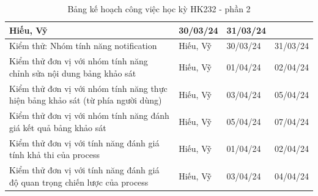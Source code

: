 \begin{table}[H]
{\begin{tabular}{|p{11cm}|p{1.75cm}|p{1.5cm}|p{1.5cm}|}
        { Hiếu, Vỹ} &
        { 30/03/24} &
        { 31/03/24} \\ \hline
        { Kiểm thử: Nhóm tính năng notification} &
        { Hiếu, Vỹ} &
        { 30/03/24} &
        { 31/03/24} \\ \hline
        { Kiểm thử đơn vị với nhóm tính năng chỉnh sửa nội dung bảng khảo sát} &
        { Hiếu, Vỹ} &
        { 01/04/24} &
        { 02/04/24} \\ \hline
        { Kiểm thử đơn vị với nhóm tính năng thực hiện bảng khảo sát (từ phía người dùng)} &
        { Hiếu, Vỹ} &
        { 03/04/24} &
        { 05/04/24} \\ \hline
        { Kiểm thử đơn vị với nhóm tính năng đánh giá kết quả bảng khảo sát} &
        { Hiếu, Vỹ} &
        { 05/04/24} &
        { 07/04/24} \\ \hline
        { Kiểm thử đơn vị với tính năng đánh giá tính khả thi của process} &
        { Hiếu, Vỹ} &
        { 01/04/24} &
        { 02/04/24} \\ \hline
        { Kiểm thử đơn vị với tính năng đánh giá độ quan trọng chiến lược của process} &
        { Hiếu, Vỹ} &
        { 03/04/24} &
        { 04/04/24} \\ \hline
        
    \end{tabular}%
    }
    \caption{Bảng kế hoạch công việc học kỳ HK232 - phần 2}
\end{table}

